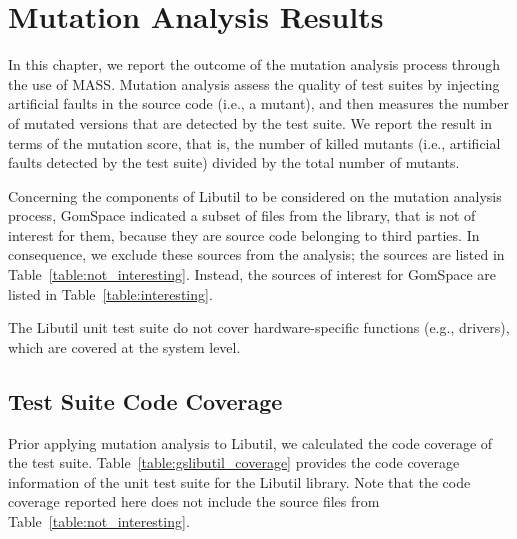 
\chapter{Mutation Analysis Results}
\label{mass_output}



In this chapter, we report the outcome of the mutation analysis process through the use of MASS. 
Mutation analysis assess the quality of test suites by injecting artificial faults in the source code (i.e., a mutant), and then measures the number of mutated versions that are detected by the test suite. We report the result in terms of the mutation score, that is, the number of killed mutants (i.e., artificial faults detected by the test suite) divided by the total number of mutants.






Concerning the components of Libutil to be considered on the mutation analysis process, GomSpace indicated a subset of files from the library, that is not of interest for them, because they are source code belonging to third parties. In consequence, we exclude these sources from the analysis; the sources are listed in Table~\ref{table:not_interesting}. 
Instead, the sources of interest for GomSpace are listed in Table~\ref{table:interesting}.

The Libutil unit test suite do not cover hardware-specific functions (e.g., drivers), which are covered at the system level.

\section{Test Suite Code Coverage}

Prior applying mutation analysis to Libutil, we calculated the code coverage of the test suite. Table~\ref{table:gslibutil_coverage} provides the code coverage information of the unit test suite for the Libutil library. Note that the code coverage reported here does not include the source files from Table~\ref{table:not_interesting}. 

